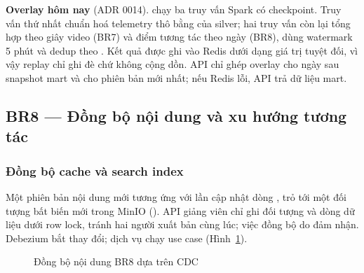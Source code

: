 \textbf{Overlay hôm nay} (ADR 0014).  chạy ba truy vấn Spark có checkpoint. Truy vấn thứ nhất chuẩn hoá telemetry thô bằng  của silver; hai truy vấn còn lại tổng hợp theo giây video (BR7) và điểm tương tác theo ngày (BR8), dùng watermark 5 phút và dedup theo . Kết quả được ghi vào Redis dưới dạng giá trị tuyệt đối, vì vậy replay chỉ ghi đè chứ không cộng dồn. API chỉ ghép overlay cho ngày sau snapshot mart và cho phiên bản mới nhất; nếu Redis lỗi, API trả dữ liệu mart.

\subsection{BR8 --- Đồng bộ nội dung và xu hướng tương tác}

\subsubsection{Đồng bộ cache và search index}
\label{sec:br8-sync}

Một phiên bản nội dung mới tương ứng với lần cập nhật dòng , trỏ tới một đối tượng bất biến mới trong MinIO (). API giảng viên chỉ ghi đối tượng và dòng dữ liệu dưới row lock, tránh hai người xuất bản cùng lúc; việc đồng bộ do  đảm nhận. Debezium bắt thay đổi; dịch vụ  chạy use case  (Hình~\ref{fig:sync}).

\begin{figure}[H]
\centering
{}
\caption{Đồng bộ nội dung BR8 dựa trên CDC}
\label{fig:sync}
\end{figure}

